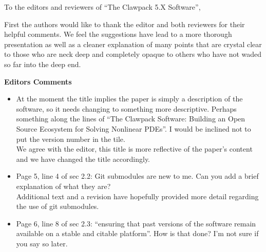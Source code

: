 \documentclass{letter}
\begin{document}
\address{Clawpack Developers}
\signature{Kyle T. Mandli, \\
           Aron J. Ahmadia, \\
           Donna Calhoun, \\
           David George, \\
           Yiannis Hadjimichael, \\ 
           David I. Ketcheson, \\
           Grady I. Lemoine, and \\
           Randall J. LeVeque}

\begin{letter}
{
}

\opening{To the editors and reviewers of ``The Clawpack 5.X Software'',}

First the authors would like to thank the editor and both reviewers for their
helpful comments.  We feel the suggestions have lead to a more thorough
presentation as well as a cleaner explanation of many points that are crystal
clear to those who are neck deep and completely opaque to others who have not
waded so far into the deep end.

\textbf{\large Editors Comments}
\begin{itemize}
    \item At the moment the title implies the paper is simply a description of
    the software, so it needs changing to something more descriptive. Perhaps
    something along the lines of ``The Clawpack Software: Building an Open
    Source Ecosystem for Solving Nonlinear PDEs''. I would be inclined not to
    put the version number in the tile. \\
    
    We agree with the editor, this title is more reflective of the paper's
    content and we have changed the title accordingly. \\


    \item Page 5, line 4 of sec 2.2: Git submodules are new to me. Can you add a
    brief explanation of what they are? \\

    Additional text and a revision have hopefully provided more detail regarding
    the use of git submodules. \\

    \item Page 6, line 8 of sec 2.3: ``ensuring that past versions of the
    software remain available on a stable and citable platform''. How is that
    done? I'm not sure if you say so later. \\


\end{itemize}
\end{letter}
\end{document}

